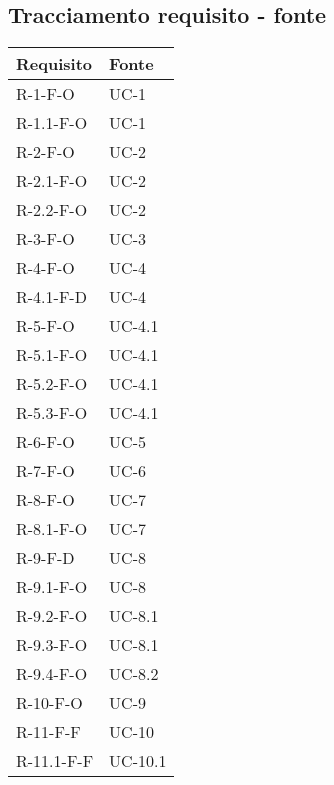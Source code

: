 \subsection{Tracciamento requisito - fonte}\label{subsec:tracciamento-requisiti---fonte}

\begin{longtable}{| C{6cm} |C{6cm}|}
    \hline
    \textbf{Requisito} & \textbf{Fonte}  \\\hline
    R-1-F-O            & UC-1            \\\hline
    R-1.1-F-O          & UC-1            \\\hline
    R-2-F-O            & UC-2            \\\hline
    R-2.1-F-O          & UC-2            \\\hline
    R-2.2-F-O          & UC-2            \\\hline
    R-3-F-O            & UC-3            \\\hline
    R-4-F-O            & UC-4            \\\hline
    R-4.1-F-D          & UC-4            \\\hline
    R-5-F-O            & UC-4.1          \\\hline
    R-5.1-F-O          & UC-4.1          \\\hline
    R-5.2-F-O          & UC-4.1          \\\hline
    R-5.3-F-O          & UC-4.1          \\\hline
    R-6-F-O            & UC-5            \\\hline
    R-7-F-O            & UC-6            \\\hline
    R-8-F-O            & UC-7            \\\hline
    R-8.1-F-O          & UC-7            \\\hline
    R-9-F-D            & UC-8            \\\hline
    R-9.1-F-O          & UC-8            \\\hline
    R-9.2-F-O          & UC-8.1          \\\hline
    R-9.3-F-O          & UC-8.1          \\\hline
    R-9.4-F-O          & UC-8.2          \\\hline
    R-10-F-O           & UC-9            \\\hline
    R-11-F-F           & UC-10           \\\hline
    R-11.1-F-F         & UC-10.1         \\\hline

\end{longtable}
